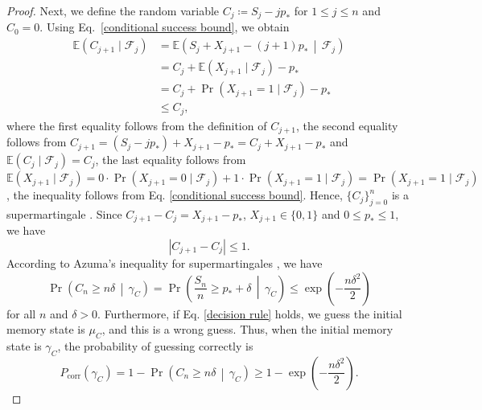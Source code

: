 \documentclass[aps,pra,twocolumn,floatfix,amsfonts,10pt]{revtex4-2}
\begin{document}
\begin{proof}
	Next, we define the random variable $C_j\coloneqq S_j-jp_*$ for $1\leqslant j \leqslant n$ and $C_0=0$.
	Using Eq.~\eqref{conditional success bound}, we obtain
	\begin{equation}
		\begin{aligned}
			\mathbb{E}\left(C_{j+1}\mid \mathcal{F}_j\right) &= \mathbb{E}\left(S_j+X_{j+1}-(j+1)p_*\,\middle|\,\mathcal{F}_j\right) \\ &= C_j+\mathbb{E}\left(X_{j+1}\mid \mathcal{F}_j\right)-p_*\\ &= C_j+\Pr(X_{j+1}=1\mid \mathcal{F}_j)-p_* \\ &\leqslant C_j,
		\end{aligned}
	\end{equation}
	where the first equality follows from the definition of $C_{j+1}$, the second equality follows from $C_{j+1} = (S_j-jp_*)+X_{j+1}-p_* = C_j+X_{j+1}-p_*$ and $\mathbb{E}(C_j\mid \mathcal{F}_j) = C_j$, the last equality follows from $\mathbb{E}\left(X_{j+1}\mid \mathcal{F}_j\right) = 0 \cdot \Pr(X_{j+1}=0\mid \mathcal{F}_j) + 1 \cdot \Pr(X_{j+1}=1\mid \mathcal{F}_j) = \Pr(X_{j+1}=1\mid \mathcal{F}_j)$, the inequality follows from Eq. \eqref{conditional success bound}.
	Hence, $\{C_j\}_{j=0}^{n}$ is a supermartingale \cite{R1995}. 
	Since $C_{j+1}-C_j=X_{j+1}-p_*$, $X_{j+1}\in\{0,1\}$ and $0\leqslant p_*\leqslant 1$, we have
	\begin{equation}
		\left|C_{j+1}-C_j\right|\leqslant 1.
	\end{equation}
	According to Azuma's inequality for supermartingales \cite{A1967}, we have
	\begin{equation}
		\Pr\left(C_n\geqslant n\delta\,\middle|\,\gamma_C\right) = 	\Pr\left(\frac{S_n}{n}\geqslant p_*+\delta\,\middle|\,\gamma_C \right) \leqslant \exp\left(-\frac{n\delta^2}{2}\right)
	\end{equation}
	for all $n$ and $\delta > 0$.
	Furthermore, if Eq. \eqref{decision rule} holds, we guess the initial memory state is $\mu_C$, and this is a wrong guess.
	Thus, when the initial memory state is $\gamma_C$, the probability of guessing correctly is
	\begin{equation}\label{probability gamma}
		P_{\mathrm{corr}}(\gamma_C) = 1-\Pr\left(C_n\geqslant n\delta\,\middle|\,\gamma_C\right) \geqslant 1-\exp\left(-\frac{n\delta^2}{2}\right).
	\end{equation}
	

\end{proof}
\end{document}
